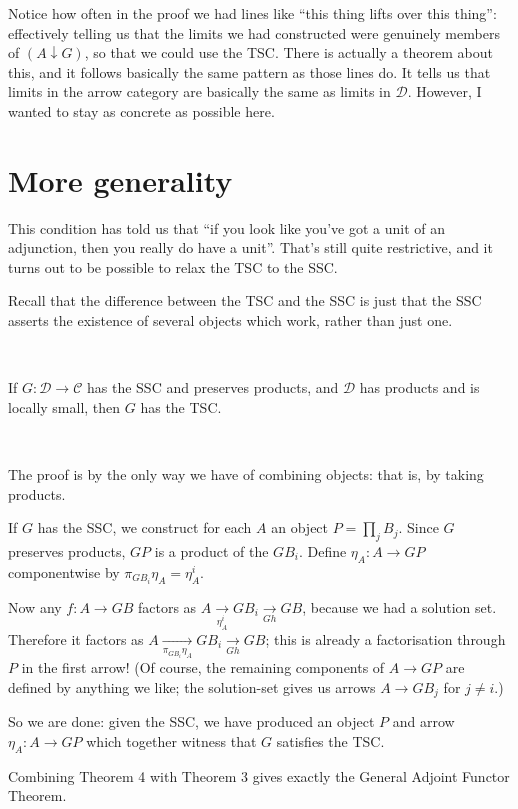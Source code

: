 \documentclass[11pt]{amsart}
\begin{document}
Notice how often in the proof we had lines like ``this thing lifts over this thing'': effectively telling us that the limits we had constructed were genuinely members of $(A \downarrow G)$, so that we could use the TSC.
There is actually a theorem about this, and it follows basically the same pattern as those lines do.
It tells us that limits in the arrow category are basically the same as limits in $\mathcal{D}$.
However, I wanted to stay as concrete as possible here.

\section{More generality}

This condition has told us that ``if you look like you've got a unit of an adjunction, then you really do have a unit''.
That's still quite restrictive, and it turns out to be possible to relax the TSC to the SSC.

Recall that the difference between the TSC and the SSC is just that the SSC asserts the existence of several objects which work, rather than just one.

\

\begin{thm} If $G: \mathcal{D} \to \mathcal{C}$ has the SSC and preserves products, and $\mathcal{D}$ has products and is locally small, then $G$ has the TSC.
\end{thm}

\

The proof is by the only way we have of combining objects: that is, by taking products.

If $G$ has the SSC, we construct for each $A$ an object $P = \prod_j B_j$.
Since $G$ preserves products, $GP$ is a product of the $G B_i$.
Define $\eta_A: A \to GP$ componentwise by $\pi_{G B_i} \eta_A = \eta_A^i$.

Now any $f:A \to GB$ factors as $A \xrightarrow[\eta_A^i]{} G B_i \xrightarrow[Gh]{} GB$, because we had a solution set.
Therefore it factors as $A \xrightarrow[\pi_{G B_i} \eta_A]{} G B_i \xrightarrow[Gh]{} GB$; this is already a factorisation through $P$ in the first arrow!
(Of course, the remaining components of $A \to GP$ are defined by anything we like; the solution-set gives us arrows $A \to G B_j$ for $j \not = i$.)

So we are done: given the SSC, we have produced an object $P$ and arrow $\eta_A: A \to GP$ which together witness that $G$ satisfies the TSC.

Combining Theorem 4 with Theorem 3 gives exactly the General Adjoint Functor Theorem.
\end{document}
